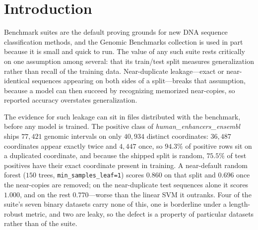 \documentclass[webpdf,modern,large,namedate]{oup-authoring-template}%
\begin{document}

\maketitle

\section{Introduction}\label{sec:intro}

Benchmark suites are the default proving grounds for new DNA sequence classification methods, and the Genomic Benchmarks collection \citep{gresova2023} is used in part because it is small and quick to run. The value of any such suite rests critically on one assumption among several: that its train/test split measures generalization rather than recall of the training data. Near-duplicate leakage---exact or near-identical sequences appearing on both sides of a split---breaks that assumption, because a model can then succeed by recognizing memorized near-copies, so reported accuracy overstates generalization.

The evidence for such leakage can sit in files distributed with the benchmark, before any model is trained. The positive class of \textit{human\_enhancers\_ensembl} ships $77{,}421$ genomic intervals on only $40{,}934$ distinct coordinates: $36{,}487$ coordinates appear exactly twice and $4{,}447$ once, so $94.3\%$ of positive rows sit on a duplicated coordinate, and because the shipped split is random, $75.5\%$ of test positives have their exact coordinate present in training. A near-default random forest ($150$ trees, \texttt{min\_samples\_leaf=1}) scores $0.860$ on that split and $0.696$ once the near-copies are removed; on the near-duplicate test sequences alone it scores $1.000$, and on the rest $0.770$---worse than the linear SVM it outranks. Four of the suite's seven binary datasets carry none of this, one is borderline under a length-robust metric, and two are leaky, so the defect is a property of particular datasets rather than of the suite.
\end{document}
